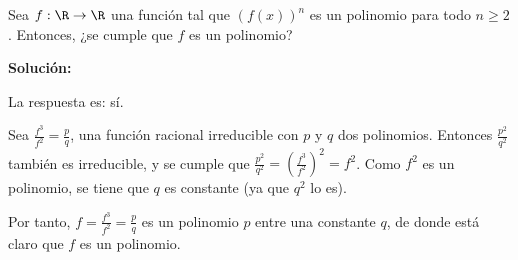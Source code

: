 \documentclass[../../main.tex]{subfiles}
\begin{document}
  \begin{shaded}
    Sea $f: \R \to \R$ una función tal que $(f(x))^n$ es un polinomio para todo $n \geq 2$. Entonces, ¿se cumple que $f$ es un polinomio?
  \end{shaded}

  \textbf{Solución:}

  La respuesta es: sí.
  
  Sea $\displaystyle\frac{f^3}{f^2} = \displaystyle\frac{p}{q}$, una función racional irreducible con $p$ y $q$ dos polinomios. Entonces $\displaystyle\frac{p^2}{q^2}$ también es irreducible, y se cumple que $\displaystyle\frac{p^2}{q^2} = \left(\displaystyle\frac{f^3}{f^2}\right)^2 = f^2$. Como $f^2$ es un polinomio, se tiene que $q$ es constante (ya que $q^2$ lo es).

  Por tanto, $f = \displaystyle\frac{f^3}{f^2} = \displaystyle\frac{p}{q}$ es un polinomio $p$ entre una constante $q$, de donde está claro que $f$ es un polinomio.
\end{document}
